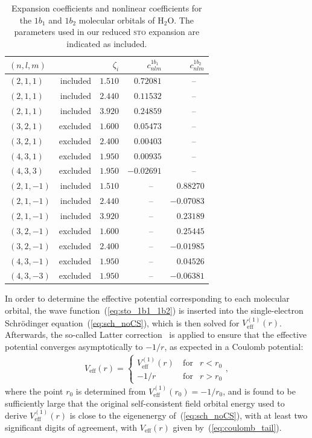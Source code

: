 \begin{table}[t]
 \centering
  \caption{\label{tab:1b11b2_coef} Expansion coefficients and
    nonlinear coefficients for the $1b_{1}$ and $1b_{2}$ molecular
    orbitals of H$_{2}$O. The parameters used in our reduced
    \textsc{sto} expansion are indicated as included.}
  \begin{tabular}{lrrrr}
    \toprule
    $(n,l, m)$ & & $\zeta_{i}$ & $c_{nlm}^{1b_{1}}$ & $c_{nlm}^{1b_{2}}$ \\
    \midrule
    $(2,1,1)$ & included & $1.510$ & $0.72081$ & --~~ \\
    $(2,1,1)$ & included & $2.440$ & $0.11532$ & --~~ \\
    $(2,1,1)$ & included & $3.920$ & $0.24859$ & --~~ \\
    $(3,2,1)$ & excluded & $1.600$ & $0.05473$ & --~~ \\
    $(3,2,1)$ & excluded & $2.400$ & $0.00403$ & --~~ \\
    $(4,3,1)$ & excluded & $1.950$ & $0.00935$ & --~~ \\
    $(4,3,3)$ & excluded & $1.950$ & $-0.02691$ & --~~ \\
    $(2,1,-1)$ & included & $1.510$ & --~~ & $0.88270$ \\
    $(2,1,-1)$ & included & $2.440$ & --~~ & $-0.07083$ \\
    $(2,1,-1)$ & included & $3.920$ & --~~ & $0.23189$ \\
    $(3,2,-1)$ & excluded & $1.600$ & --~~ & $0.25445$ \\
    $(3,2,-1)$ & excluded & $2.400$ & --~~ & $-0.01985$ \\
    $(4,3,-1)$ & excluded & $1.950$ & --~~ & $0.04526$ \\
    $(4,3,-3)$ & excluded & $1.950$ & --~~ & $-0.06381$ \\
    \bottomrule
  \end{tabular}
\end{table}

In order to determine the effective potential corresponding to each
molecular orbital, the wave function~(\ref{eq:sto_1b1_1b2}) is inserted
into the single-electron Schr\"{o}dinger equation~(\ref{eq:sch_noCS}),
which is then solved for $V_{\mathrm{eff}}^{(1)}(r)$. Afterwards, the
so-called Latter correction~\cite{LatterCor_1955,sarias_2016} is
applied to ensure that the effective potential converges
asymptotically to $-1/r$, as expected in a Coulomb potential:
%
\begin{eqnarray}
V_{\mathrm{eff}}(r) = \left\{
\begin{split}
V_{\mathrm{eff}}^{(1)}(r)\  & \mathrm{for} & r < r_{0} \\
-1/r\  & \mathrm{for} & r > r_{0}
\end{split}
\right.
,
\label{eq:coulomb_tail}
\end{eqnarray}
%
where the point $r_{0}$ is determined from $V_{\mathrm{eff}}^{(1)}(r_{0}) =
-1/r_{0}$, and is found to be sufficiently large that the original
self-consistent field orbital energy used to derive
$V_{\mathrm{eff}}^{(1)}(r)$ is close to the eigenenergy
of~(\ref{eq:sch_noCS}), with at least two significant digits of
agreement, with $V_{\mathrm{eff}}(r)$ given
by~(\ref{eq:coulomb_tail}).

